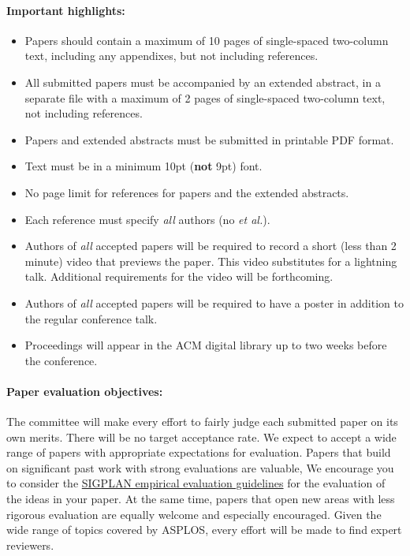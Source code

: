 \documentclass[pageno]{jpaper}
\begin{document}
\paragraph{Important highlights:}
\begin{itemize}
\item Papers should contain a
maximum of 10 pages of single-spaced two-column text, including any
appendixes, but not including references.
\item All submitted papers must be accompanied by an extended
  abstract, in a separate file with a maximum of 
2 pages of single-spaced two-column text, not including references.
\item Papers and extended abstracts must be submitted in printable PDF format.
\item Text must be in a minimum 10pt ({\bf not} 9pt) font.
\item No page limit for references for papers and the extended abstracts.
\item Each reference must specify {\em all} authors (no {\em et al.}).
\item Authors of {\em all} accepted papers will be required
  to record a short (less than 2 minute) video that previews the paper.
  This video substitutes for a lightning talk.
  Additional requirements for the video will be forthcoming.
\item Authors of {\em all} accepted papers will be required to have a poster in addition to the regular
conference talk.
\item Proceedings will appear in the ACM digital library up to two weeks
before the conference.
\end{itemize}

\paragraph{Paper evaluation objectives:}
The committee will make every effort to fairly judge each submitted paper on
its own merits. There will be no target acceptance rate.  We expect to
accept a wide range of papers with appropriate expectations for
evaluation. Papers that build on significant past work with
strong evaluations are valuable,  We encourage you to consider the
\href{https://www.sigplan.org/Resources/EmpiricalEvaluation/}{SIGPLAN
  empirical evaluation guidelines} for the evaluation of the ideas in
your paper. At the same time,  papers that open new areas with less
rigorous evaluation are equally welcome and especially encouraged.
Given the wide range of topics covered by ASPLOS, every effort will be
made to find expert reviewers.
\end{document}
